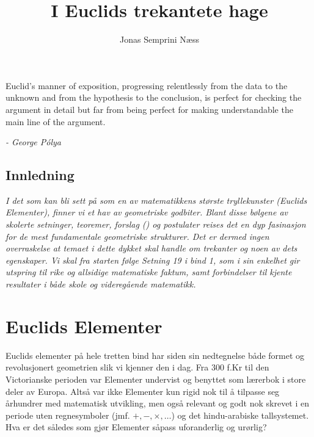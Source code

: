 \documentclass[12pt,
               a4paper,
               article,
               oneside,
               oldfontcommands,
               norsk]{memoir}
\title{I Euclids trekantete hage}
\author{Jonas Semprini Næss}
\begin{document}
\maketitle
\epigraph{\centering Euclid's manner of exposition, progressing relentlessly from the data to the unknown and from the hypothesis to the conclusion, is perfect for checking the argument in detail but far from being perfect for making understandable the main line of the argument.}{\textit{- George Pólya}}
\subsection*{\protect \centering Innledning}
\emph{I det som kan bli sett på som en av matematikkens største tryllekunster (Euclids Elementer), finner vi et hav av geometriske godbiter. Blant disse bølgene av skolerte setninger, teoremer, forslag () og postulater reises det en dyp fasinasjon for de mest fundamentale geometriske strukturer. Det er dermed ingen overraskelse at temaet i dette dykket skal handle om trekanter og noen av dets egenskaper. Vi skal fra starten følge Setning 19 i bind 1, som i sin enkelhet gir utspring til rike og allsidige matematiske faktum, samt forbindelser til kjente resultater i både skole og videregående matematikk.}
\section*{\protect \centering Euclids Elementer}
Euclids elementer på hele tretten bind har siden sin nedtegnelse både formet og revolusjonert geometrien slik vi kjenner den i dag. Fra $300$ f.Kr til den Victorianske perioden var Elementer undervist og benyttet som lærerbok i store deler av Europa. Altså var ikke Elementer kun rigid nok til å tilpasse seg århundrer med matematisk utvikling, men også relevant og godt nok skrevet i en periode uten regnesymboler (jmf. $+, -, \times, \ldots$) og det hindu-arabiske tallsystemet. Hva er det således som gjør Elementer såpass uforanderlig og urørlig?
\end{document}
